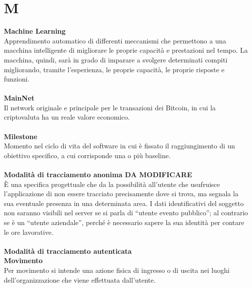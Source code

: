 \section{M}
\textbf{Machine Learning}\\
Apprendimento automatico di differenti meccanismi che permettono a una macchina intelligente di migliorare le proprie capacità e prestazioni nel tempo. La macchina, quindi, sarà in grado di imparare a svolgere determinati compiti migliorando, tramite l’esperienza, le proprie capacità, le proprie risposte e funzioni. \\ \\
\textbf{MainNet}\\
Il network originale e principale per le transazioni dei Bitcoin, in cui la criptovaluta ha un reale valore economico. \\ \\
\textbf{Milestone}\\
Momento nel ciclo di vita del software in cui è fissato il raggiungimento di un obiettivo specifico, a cui corrisponde una o più baseline.\\ \\
\textbf{Modalità di tracciamento anonima DA MODIFICARE}\\
È una specifica progettuale che da la possibilità all’utente che usufruisce l’applicazione di non essere tracciato precisamente dove si trova, ma segnala la sua eventuale presenza in una determinata area. I dati identificativi del soggetto non saranno visibili nel server se si parla di “utente evento pubblico”; al contrario se è un “utente aziendale”, perché è necessario sapere la sua identità per contare le ore lavorative. \\ \\

\textbf{Modalità di tracciamento autenticata}\\

\textbf{Movimento}\\
Per movimento si intende una azione fisica di ingresso o di uscita nei luoghi dell'organizzazione che viene effettuata dall'utente. \\ \\
\clearpage